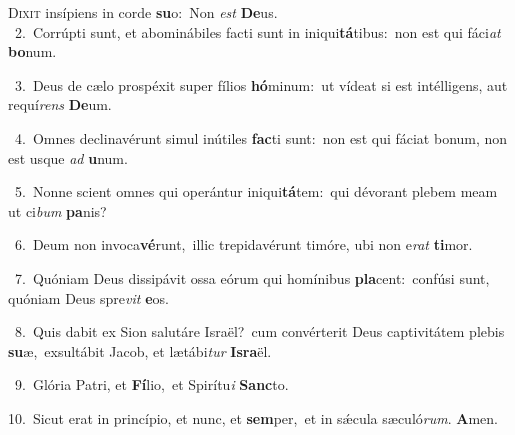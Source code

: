 \lettrine{\initial\textcolor{\initialcolor}{D}}{ixit} insípiens in corde \textbf{su}\-o:~\star Non \textit{est} \textbf{De}\-us.\\
{\numbfont\textcolor{\numbcolor}{~2.}}~Corrúpti sunt, et abominábiles facti sunt in iniqui\-\textbf{tá}\-tibus:~\star non est qui fáci\textit{at} \textbf{bo}\-num.\par
{\numbfont\textcolor{\numbcolor}{~3.}}~Deus de cælo prospéxit super fílios \textbf{hó}\-minum:~\star ut vídeat si est intélligens, aut requí\textit{rens} \textbf{De}\-um.\par
{\numbfont\textcolor{\numbcolor}{~4.}}~Omnes declinavérunt simul inútiles \textbf{fac}\-ti sunt:~\star non est qui fáciat bonum, non est usque \textit{ad} \textbf{u}\-num.\par
{\numbfont\textcolor{\numbcolor}{~5.}}~Nonne scient omnes qui operántur iniqui\-\textbf{tá}\-tem:~\star qui dévorant plebem meam ut ci\textit{bum} \textbf{pa}\-nis?\par
{\numbfont\textcolor{\numbcolor}{~6.}}~Deum non invoca\-\textbf{vé}\-runt,~\star illic trepidavérunt timóre, ubi non e\textit{rat} \textbf{ti}\-mor.\par
{\numbfont\textcolor{\numbcolor}{~7.}}~Quóniam Deus dissipávit ossa eórum qui homínibus \textbf{pla}\-cent:~\star confúsi sunt, quóniam Deus spre\textit{vit} \textbf{e}\-os.\par
{\numbfont\textcolor{\numbcolor}{~8.}}~Quis dabit ex Sion salutáre Israël?~\dagger cum convérterit Deus captivitátem plebis \textbf{su}\-æ,~\star exsultábit Jacob, et lætábi\textit{tur} \textbf{Is}\-\textbf{ra}ël.\par
{\numbfont\textcolor{\numbcolor}{~9.}}~Glória Patri, et \textbf{Fí}\-lio,~\star et Spirítu\textit{i} \textbf{Sanc}\-to.\par
{\numbfont\textcolor{\numbcolor}{10.}}~Sicut erat in princípio, et nunc, et \textbf{sem}\-per,~\star et in sǽcula sæculó\-\textit{rum}\-. \textbf{A}\-men.\par
